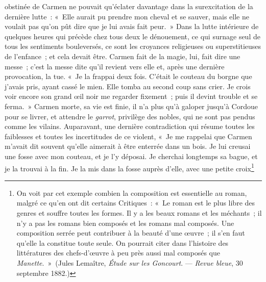 \documentclass[french,twoside]{book} %
\begin{document}
obstinée de Carmen ne pouvait qu’éclater davantage dans la surexcitation de la dernière lutte : « Elle aurait pu prendre mon cheval et se sauver, mais elle ne voulait pas qu’on pût dire que je lui avais fait peur. » Dans la lutte intérieure de quelques heures qui précède chez tous deux le dénouement, ce qui surnage seul de tous les sentiments bouleversés, ce sont les croyances religieuses ou superstitieuses de l’enfance ; et cela devait être. Carmen fait de la magie, lui, fait dire une messe ; c’est la messe dite qu’il revient vers elle et, après une dernière provocation, la tue. « Je la frappai deux fois. C’était le couteau du borgne que j’avais pris, ayant cassé le mien. Elle tomba au second coup sans crier. Je crois voir encore son grand œil noir me regarder fixement ; puis il devint trouble et se ferma. » Carmen morte, sa vie est finie, il n’a plus qu’à galoper jusqu’à Cordoue pour se livrer, et attendre le \emph{garrot}, privilège des nobles, qui ne sont pas pendus comme les vilains. Auparavant, une dernière contradiction qui résume toutes les faiblesses et toutes les incertitudes de ce violent, « Je me rappelai que Carmen m’avait dit souvent qu’elle aimerait à être enterrée dans un bois. Je lui creusai une fosse avec mon couteau, et je l’y déposai. Je cherchai longtemps sa bague, et je la trouvai à la fin. Je la mis dans la fosse auprès d’elle, avec une petite croix\footnote{\noindent On voit par cet exemple combien la composition est essentielle au roman, malgré ce qu’en ont dit certains Critiques : « Le roman est le plus libre des genres et souffre toutes les formes. Il y a les beaux romans et les méchants ; il n’y a pas les romans bien composés et les romans mal composés. Une composition serrée peut contribuer à la beauté d’une œuvre ; il s’en faut qu’elle la constitue toute seule. On pourrait citer dans l’histoire des littératures des chefs-d’œuvre à peu près aussi mal composés que \emph{Manette}. » (Jules Lemaître, \emph{Étude sur les Goncourt}. — \emph{Revue bleue}, 30 septembre 1882.)\par
}
\end{document}

